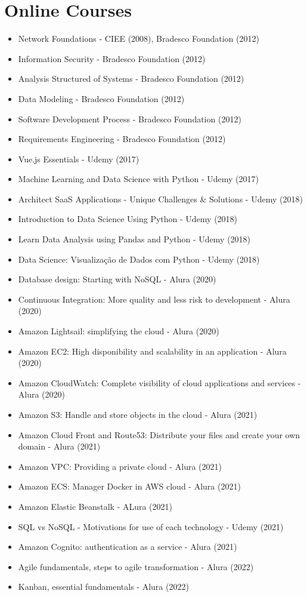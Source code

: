 \section{Online Courses}
\begin{itemize}
    \item Network Foundations - CIEE (2008), Bradesco Foundation (2012)
    \item Information Security - Bradesco Foundation (2012)
    \item Analysis Structured of Systems - Bradesco Foundation (2012)
    \item Data Modeling - Bradesco Foundation (2012)
    \item Software Development Process - Bradesco Foundation (2012)
    \item Requirements Engineering - Bradesco Foundation (2012)
    \item Vue.js Essentials - Udemy (2017)
    \item Machine Learning and Data Science with Python - Udemy (2017)
    \item Architect SaaS Applications - Unique Challenges & Solutions - Udemy (2018)
    \item Introduction to Data Science Using Python - Udemy (2018)
    \item Learn Data Analysis using Pandas and Python - Udemy (2018)
    \item Data Science: Visualização de Dados com Python - Udemy (2018)
    \item Database design: Starting with NoSQL - Alura (2020)
    \item Continuous Integration: More quality and less risk to development - Alura (2020)
    \item Amazon Lightsail: simplifying the cloud - Alura (2020)
    \item Amazon EC2: High disponibility and scalability in an application - Alura (2020)
    \item Amazon CloudWatch: Complete visibility of cloud applications and services - Alura (2020)
    \item Amazon S3: Handle and store objects in the cloud - Alura (2021)
    \item Amazon Cloud Front and Route53: Distribute your files and create your own domain - Alura (2021)
    \item Amazon VPC: Providing a private cloud - Alura (2021)
    \item Amazon ECS: Manager Docker in AWS cloud - Alura (2021)
    \item Amazon Elastic Beanstalk - ALura (2021)
    \item SQL vs NoSQL - Motivations for use of each technology - Udemy (2021)
    \item Amazon Cognito: authentication as a service - Alura (2021)
    \item Agile fundamentals, steps to agile transformation - Alura (2022)
    \item Kanban, essential fundamentals - Alura (2022)
\end{itemize}

